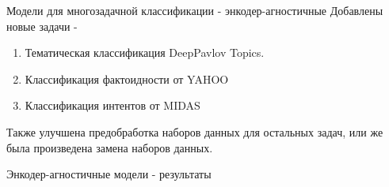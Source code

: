 \begin{frame}{Модели для многозадачной классификации - энкодер-агностичные}
Добавлены новые задачи - 
\begin{enumerate}
    \item Тематическая классификация DeepPavlov Topics.
    \item Классификация фактоидности от YAHOO
    \item Классификация интентов от MIDAS
\end{enumerate}
Также улучшена предобработка наборов данных для остальных задач, или же была произведена замена наборов данных.
\end{frame}
\begin{frame}{Энкодер-агностичные модели - результаты}
\begin{table}[htbp]
\caption{Точность/взвешенный-F1) для оценки моделей в экспериментах с энкодер-агностичными моделями. Для не-Коботовских задач при оценке используются оригинальные тестовые наборы данных, для коботовских -- тестовая часть разбиения данных. Как distilbert обозначается модель \textit{distilbert-base-uncased}, как bert модель \textit{bert-base-uncased}. «С историей» означает использование диалоговой истории только в задаче MIDAS, «Без истории» означает, что деалоговая история не использовалась ни в одной задаче «Размер» означает размер обучающей выборки. Режим S означает, что обучались однозадачные модели, M означает, что обучалась многозадачная модель.}
\end{table}
\end{frame}
